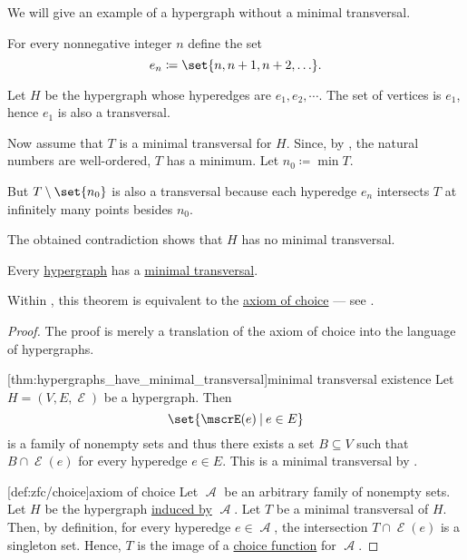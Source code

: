 \begin{example}\label{ex:hypergraph_with_no_minimal_transversal}
  We will give an example of a hypergraph without a minimal transversal.

  For every nonnegative integer \( n \) define the set
  \begin{equation*}
    e_n \coloneqq \set{ n, n + 1, n + 2, \ldots }.
  \end{equation*}

  Let \( H \) be the hypergraph whose hyperedges are \( e_1, e_2, \cdots \). The set of vertices is \( e_1 \), hence \( e_1 \) is also a transversal.

  Now assume that \( T \) is a minimal transversal for \( H \). Since, by , the natural numbers are well-ordered, \( T \) has a minimum. Let \( n_0 \coloneqq \min T \).

  But \( T \setminus \set{ n_0 } \) is also a transversal because each hyperedge \( e_n \) intersects \( T \) at infinitely many points besides \( n_0 \).

  The obtained contradiction shows that \( H \) has no minimal transversal.
\end{example}

\begin{theorem}\label{thm:hypergraphs_have_minimal_transversal}
  Every \hyperref[def:hypergraph]{hypergraph} has a \hyperref[def:hypergraph_minimal_transversal]{minimal transversal}.

  Within \hyperref[def:zfc]{}, this theorem is equivalent to the \hyperref[def:zfc/choice]{axiom of choice} --- see .
\end{theorem}
\begin{proof}
  The proof is merely a translation of the axiom of choice into the language of hypergraphs.

  [thm:hypergraphs_have_minimal_transversal]{minimal transversal existence} Let \( H = (V, E, \mscrE) \) be a hypergraph. Then
  \begin{equation*}
    \set{ \mscrE(e) \given e \in E }
  \end{equation*}
  is a family of nonempty sets and thus there exists a set \( B \subseteq V \) such that \( B \cap \mscrE(e) \) for every hyperedge \( e \in E \). This is a minimal transversal by .

  [def:zfc/choice]{axiom of choice} Let \( \mscrA \) be an arbitrary family of nonempty sets. Let \( H \) be the hypergraph \hyperref[thm:family_of_sets_induces_hypergraph]{induced by} \( \mscrA \). Let \( T \) be a minimal transversal of \( H \). Then, by definition, for every hyperedge \( e \in \mscrA \), the intersection \( T \cap \mscrE(e) \) is a singleton set. Hence, \( T \) is the image of a \hyperref[def:choice_function]{choice function} for \( \mscrA \).
\end{proof}
